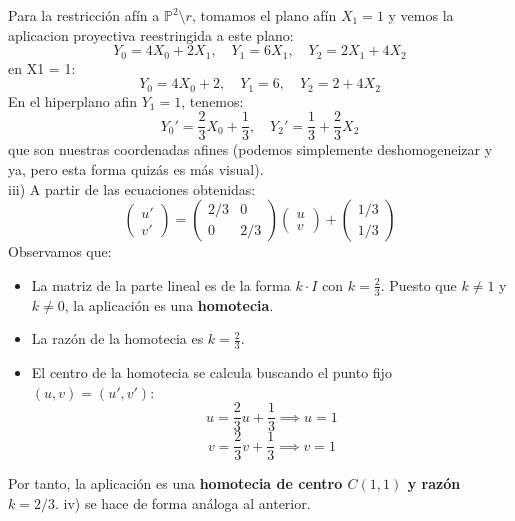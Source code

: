 {Para la restricción afín a $\mathbb{P}^2 \setminus r$, tomamos el plano afín $X_1 = 1$ y vemos la aplicacion proyectiva reestringida a este plano:
\[Y_0 = 4X_0 + 2X_1, \quad Y_1 = 6X_1, \quad Y_2 = 2X_1 + 4X_2 \] en X1 = 1:
\[Y_0 = 4X_0 + 2, \quad Y_1 = 6, \quad Y_2 = 2 + 4X_2 \]
En el hiperplano afin $Y_1 = 1$, tenemos:
\[ Y_0' = \frac{2}{3}X_0 + \frac{1}{3}, \quad Y_2' = \frac{1}{3} + \frac{2}{3}X_2 \]
que son nuestras coordenadas afines (podemos simplemente deshomogeneizar y ya, pero esta forma quizás es más visual).
\\
iii)
A partir de las ecuaciones obtenidas:
$$ \begin{pmatrix} u' \\ v' \end{pmatrix} = \begin{pmatrix} 2/3 & 0 \\ 0 & 2/3 \end{pmatrix} \begin{pmatrix} u \\ v \end{pmatrix} + \begin{pmatrix} 1/3 \\ 1/3 \end{pmatrix} $$
Observamos que:
\begin{itemize}
    \item La matriz de la parte lineal es de la forma $k \cdot I$ con $k = \frac{2}{3}$. Puesto que $k \neq 1$ y $k \neq 0$, la aplicación es una \textbf{homotecia}.
    \item La razón de la homotecia es $k = \frac{2}{3}$.
    \item El centro de la homotecia se calcula buscando el punto fijo $(u,v) = (u',v')$:
    $$ u = \frac{2}{3}u + \frac{1}{3} \implies u = 1 $$
    $$ v = \frac{2}{3}v + \frac{1}{3} \implies v = 1 $$
\end{itemize}
Por tanto, la aplicación es una \textbf{homotecia de centro $C(1,1)$ y razón $k=2/3$}.
iv) se hace de forma análoga al anterior.
}

